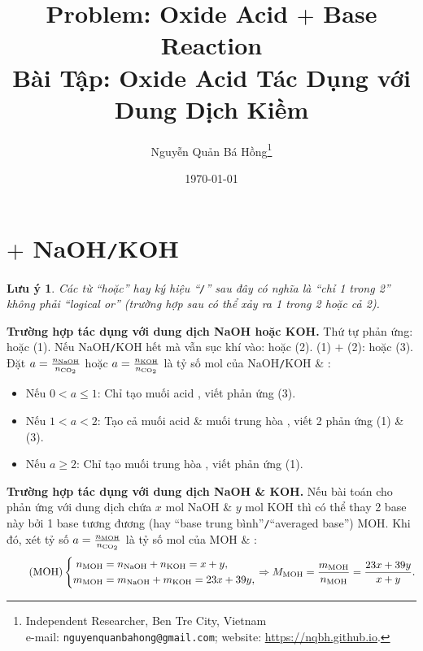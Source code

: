 \documentclass{article}
\title{Problem: Oxide Acid $+$ Base Reaction\\Bài Tập: Oxide Acid Tác Dụng với Dung Dịch Kiềm}
\author{Nguyễn Quản Bá Hồng\footnote{Independent Researcher, Ben Tre City, Vietnam\\e-mail: \texttt{nguyenquanbahong@gmail.com}; website: \url{https://nqbh.github.io}.}}
\date{\today}
\newtheorem{luuy}{Lưu ý}
\begin{document}
\maketitle
\tableofcontents


\section{ $+$ NaOH{\tt/}KOH}

\begin{luuy}
	Các từ ``hoặc'' hay ký hiệu ``{\tt/}'' sau đây có nghĩa là ``chỉ 1 trong 2'' không phải ``logical or'' (trường hợp sau có thể xảy ra 1 trong 2 hoặc cả 2).
\end{luuy}

\noindent\textbf{\textsf{Trường hợp  tác dụng với dung dịch NaOH hoặc KOH.}} Thứ tự phản ứng:  hoặc  (1). Nếu NaOH{\tt/}KOH hết mà vẫn sục khí  vào:  hoặc  (2). (1) $+$ (2):  hoặc  (3). Đặt $a = \frac{n_{\rm NaOH}}{n_{\ce{CO2}}}$ hoặc $a = \frac{n_{\rm KOH}}{n_{\ce{CO2}}}$ là tỷ số mol của NaOH{\tt/}KOH \& :
\begin{itemize}
	\item Nếu $0 < a\le 1$: Chỉ tạo muối acid , viết phản ứng (3).
	\item Nếu $1 < a < 2$: Tạo cả muối acid  \& muối trung hòa , viết 2 phản ứng (1) \& (3).
	\item Nếu $a\ge 2$: Chỉ tạo muối trung hòa , viết phản ứng (1).
\end{itemize}
\textbf{\textsf{Trường hợp  tác dụng với dung dịch NaOH \& KOH.}} Nếu bài toán cho  phản ứng với dung dịch chứa $x$ mol NaOH \& $y$ mol KOH thì có thể thay 2 base này bởi 1 base tương đương (hay ``base trung bình''{\tt/}``averaged base'') MOH. Khi đó, xét tỷ số $a = \frac{n_{\rm MOH}}{n_{\ce{CO2}}}$ là tỷ số mol của MOH \& :
\begin{equation}
	\label{MOH}
	\tag{MOH}
	\left\{\begin{split}
		n_{\rm MOH} &= n_{\rm NaOH} + n_{\rm KOH} = x + y,\\
		m_{\rm MOH} &= m_{\rm NaOH} + m_{\rm KOH} = 23x + 39y,
	\end{split}\right.\Rightarrow M_{\rm MOH} = \frac{m_{\rm MOH}}{n_{\rm MOH}} = \frac{23x + 39y}{x + y}.
\end{equation}
\end{document}
